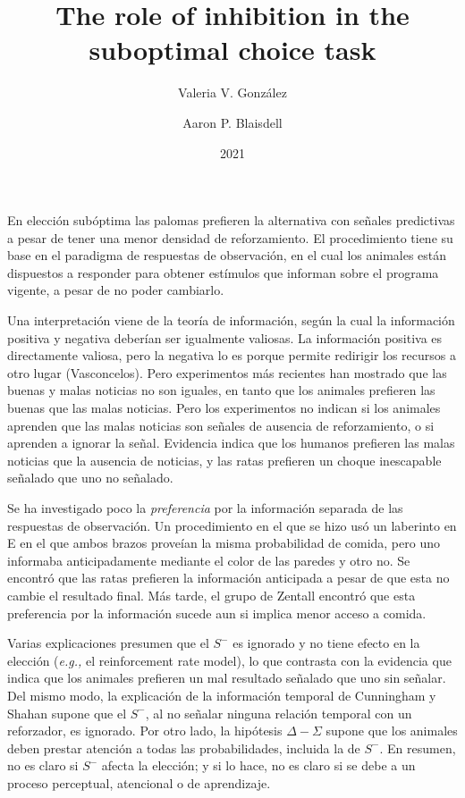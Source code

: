 \documentclass[a4paper,12pt]{article}
\title{The role of inhibition in the suboptimal choice task}
\author{Valeria V. González \and Aaron P. Blaisdell}
\date{2021}
\begin{document}
{\scshape\bfseries \maketitle}

En elección subóptima las palomas prefieren la alternativa con señales predictivas a pesar de tener una menor densidad de reforzamiento.
El procedimiento tiene su base en el paradigma de respuestas de observación, en el cual los animales están dispuestos a responder para obtener estímulos que informan sobre el programa vigente, a pesar de no poder cambiarlo.

Una interpretación viene de la teoría de información, según la cual la información positiva y negativa deberían ser igualmente valiosas.
La información positiva es directamente valiosa, pero la negativa lo es porque permite redirigir los recursos a otro lugar (Vasconcelos).
Pero experimentos más recientes han mostrado que las buenas y malas noticias no son iguales, en tanto que los animales prefieren las buenas que las malas noticias.
Pero los experimentos no indican si los animales aprenden que las malas noticias son señales de ausencia de reforzamiento, o si aprenden a ignorar la señal.
Evidencia indica que los humanos prefieren las malas noticias que la ausencia de noticias, y las ratas prefieren un choque inescapable señalado que uno no señalado.

Se ha investigado poco la {\itshape preferencia} por la información separada de las respuestas de observación.
Un procedimiento en el que se hizo usó un laberinto en E en el que ambos brazos proveían la misma probabilidad de comida, pero uno informaba anticipadamente mediante el color de las paredes y otro no.
Se encontró que las ratas prefieren la información anticipada a pesar de que esta no cambie el resultado final.
Más tarde, el grupo de Zentall encontró que esta preferencia por la información sucede aun si implica menor acceso a comida.

Varias explicaciones presumen que el $S^{-}$ es ignorado y no tiene efecto en la elección ({\itshape e.g.,} el reinforcement rate model), lo que contrasta con la evidencia que indica que los animales prefieren un mal resultado señalado que uno sin señalar.
Del mismo modo, la explicación de la información temporal de Cunningham y Shahan supone que el $S^{-}$, al no señalar ninguna relación temporal con un reforzador, es ignorado.
Por otro lado, la hipótesis $\Delta-\Sigma$ supone que los animales deben prestar atención a todas las probabilidades, incluida la de $S^{-}$.
En resumen, no es claro si $S^{-}$ afecta la elección; y si lo hace, no es claro si se debe a un proceso perceptual, atencional o de aprendizaje.
\end{document}

